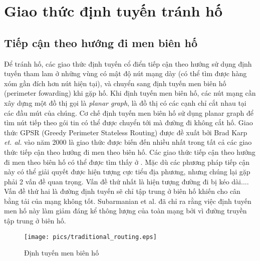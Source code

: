\documentclass[12pt]{report}
\begin{document}
\section{Giao thức định tuyến tránh hố}
\label{sec:2.2}

\subsection{Tiếp cận theo hướng đi men biên hố}
\label{sec:2.2.1}
Để tránh hố, các giao thức định tuyến cổ điển tiếp cận theo hướng sử dụng định tuyến tham lam ở những vùng có mật độ nút mạng dày (có thể tìm được hàng xóm gần đích hơn nút hiện tại), và chuyển sang định tuyến men biên hố (perimeter fowarding) khi gặp hố. Khi định tuyến men biên hố, các nút mạng cần xây dựng một đồ thị gọi là \textit{planar graph}, là đồ thị có các cạnh chỉ cắt nhau tại các đầu mút của chúng. Cơ chế định tuyến men biên hố sử dụng planar graph để tìm nút tiếp theo gói tin có thể được chuyển tới mà đường đi không cắt hố. Giao thức GPSR (Greedy Perimeter Stateless Routing) được đề xuất bởi Brad Karp \textit{et. al.} vào năm 2000 là giao thức được biến đến nhiều nhất trong tất cả các giao thức tiếp cận theo hướng đi men theo biên hố. Các giao thức tiếp cận theo hướng đi men theo biên hố có thể được tìm thấy ở \cite{}. Mặc dù các phương pháp tiếp cận này có thể giải quyết được hiện tượng cực tiểu địa phương, nhưng chúng lại gặp phải 2 vấn đề quan trọng. Vấn đề thứ nhất là hiện tượng đường đi bị kéo dài.... Vấn đề thứ hai là đường định tuyến sẽ chỉ tập trung ở biên hố khiến cho cân bằng tải của mạng không tốt. Subarmanian et al. \cite{subar} đã chỉ ra rằng việc định tuyến men hố này làm giảm đáng kể thông lượng của toàn mạng bởi vì đường truyền tập trung ở biên hố.
\begin{figure}[H]
\centering
\texttt{[image: pics/traditional\_routing.eps]}
\caption{Định tuyến men biên hố}
\end{figure}
\end{document}
